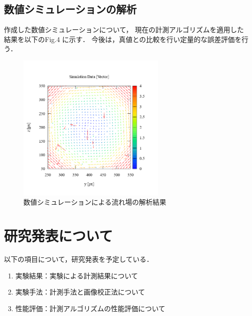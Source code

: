 \documentclass[twocolumn,a4j]{jsarticle}
\begin{document}
\subsection{数値シミュレーションの解析}
作成した数値シミュレーションについて，
現在の計測アルゴリズムを適用した結果を以下のFig.4 に示す．
今後は，真値との比較を行い定量的な誤差評価を行う．
\begin{figure}[htbp]
  \footnotesize
  \begin{center}
    \includegraphics[width=73mm]{../images/simulation_result.png}
    \caption{数値シミュレーションによる流れ場の解析結果}
  \end{center}
\end{figure}

\newpage
\section{研究発表について}
以下の項目について，研究発表を予定している．
\begin{enumerate}[(1)]
  \item 実験結果：実験による計測結果について
  \item 実験手法：計測手法と画像校正法について
  \item 性能評価：計測アルゴリズムの性能評価について
\end{enumerate}
\end{document}
